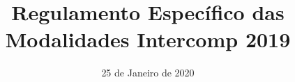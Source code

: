 \documentclass[11pt]{report}
\title{Regulamento Específico das Modalidades Intercomp 2019}
\date{25 de Janeiro de 2020}
\begin{document}





\noindent
\tableofcontents
\newpage


























\end{document}
